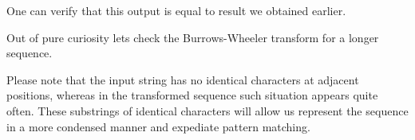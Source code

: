 \documentclass[
]{book}
\newenvironment{Shaded}{\begin{snugshade}}{\end{snugshade}}
\newcommand{\CommentTok}[1]{\textcolor[rgb]{0.56,0.35,0.01}{\textit{#1}}}
\newcommand{\FunctionTok}[1]{\textcolor[rgb]{0.00,0.00,0.00}{#1}}
\newcommand{\NormalTok}[1]{#1}
\newcommand{\StringTok}[1]{\textcolor[rgb]{0.31,0.60,0.02}{#1}}
\begin{document}
One can verify that this output is equal to result we obtained earlier.

Out of pure curiosity lets check the Burrows-Wheeler transform for a longer sequence.

\begin{Shaded}
\end{Shaded}

Please note that the input string has no identical characters at adjacent positions, whereas in the transformed sequence such situation appears quite often. These substrings of identical characters will allow us represent the sequence in a more condensed manner and expediate pattern matching.

  
\end{document}
